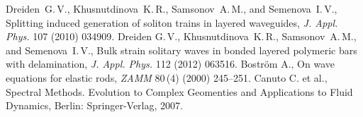 \documentclass[12pt, a4paper]{article}
\begin{document}
\begin{thebibliography}{99}
	 Dreiden~G.\,V., Khusnutdinova~K.\,R., Samsonov~A.\,M., and Semenova~I.\,V., Splitting induced generation of soliton trains in layered waveguides, \textit{J. Appl. Phys.} 107 (2010) 034909.
	 Dreiden G.\,V., Khusnutdinova~K.\,R., Samsonov~A.\,M., and Semenova~I.\,V., Bulk strain solitary waves in bonded layered polymeric bars with delamination, \textit{J. Appl. Phys.} 112 (2012) 063516.
	 Bostr\"{o}m A., On wave equations for elastic rods, \textit{ZAMM} 80\,(4) (2000) 245--251. 
	 Canuto C. et al., Spectral Methods. Evolution to Complex Geomenties and Applications to Fluid Dynamics, Berlin: Springer-Verlag, 2007.
\end{thebibliography}
\end{document}
